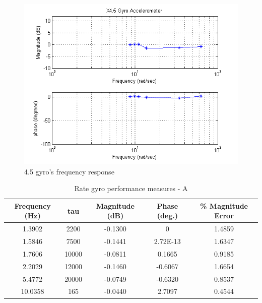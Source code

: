 \documentclass{article}
\theoremstyle{plain}
\theoremstyle{definition}
\theoremstyle{remark}
\begin{document}
\begin{figure}[hbt]
\begin{center}
\includegraphics[width = 14cm]{Gyro45Bode.png}
\caption{4.5 gyro's frequency response}
\label{gyro45Bode}
\end{center}
\end{figure}

\begin{table}
\begin{center}
    \begin{tabular}{|c|c|c|c|c|}
        \hline
        Frequency (Hz) & tau & Magnitude (dB) & Phase (deg.) & \% Magnitude Error \\ \hline
	1.3902 & 2200 & -0.1300  & 0 & 1.4859\\
       1.5846 & 7500 & -0.1441  & 2.72E-13 & 1.6347\\
	1.7606 & 10000 & -0.0811 & 0.1665 & 0.9185  \\
	2.2029& 12000 & -0.1460  & -0.6067 & 1.6654   \\
	5.4772&20000 & -0.0749  & -0.6320 & 0.8537  \\
	10.0358& 165 & -0.0440 & 2.7097 & 0.4544 \\
        \hline
    \end{tabular}
\caption{Rate gyro performance measures - A}  
\label{gyro_tableA}
\end{center}
\end{table}
\end{document}
